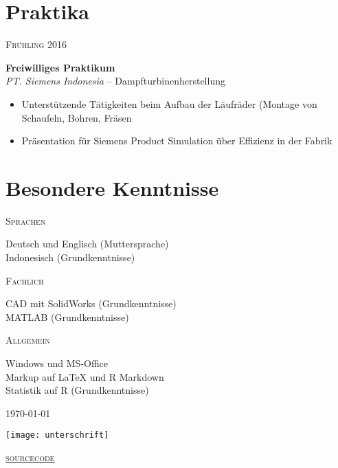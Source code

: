 \documentclass[a4paper]{article}
\newcommand{\entry}[4]{

	\begin{minipage}[t]{.20\textwidth}
		\hfill \textsc{#1}

	\end{minipage}
	\hfill\vline\hfill
	\begin{minipage}[t]{.75\textwidth}
		\textbf{#2} \\ 
		\textit{#3}    
		#4

	\end{minipage} 
	\vspace{.25cm}

}
\newcommand{\nentry}[2]{

	\begin{minipage}[t]{.20\textwidth}
		\hfill \textsc{#1}

	\end{minipage}
	\hfill\vline\hfill
	\begin{minipage}[t]{.75\textwidth}
		#2 

	\end{minipage}
	\vspace{.25cm} 

}
\begin{document}
\section{Praktika}

\entry{Fr{\"u}hling 2016}{Freiwilliges Praktikum}{PT. Siemens Indonesia}{-- Dampfturbinenherstellung\vspace{-.25cm} 
	\begin{itemize}[leftmargin=*]
		\setlength{\itemsep}{-3pt}
		\item Unterst{\"u}tzende T{\"a}tigkeiten beim Aufbau der L{\"a}ufr{\"a}der \newline \phantom{W}(Montage von Schaufeln, Bohren, Fr{\"a}sen
		\item Pr{\"a}sentation f{\"u}r Siemens Product Simulation {\"u}ber Effizienz in der Fabrik
	\end{itemize}	
}

\section{Besondere Kenntnisse}

\nentry{Sprachen}{Deutsch und Englisch (Muttersprache)\\ Indonesisch (Grundkenntnisse)}

\nentry{Fachlich}{CAD mit SolidWorks (Grundkenntnisse) \\ MATLAB (Grundkenntnisse)}

\nentry{Allgemein}{Windows und MS-Office\\Markup auf {\LaTeX} und R Markdown\\Statistik auf R (Grundkenntnisse)}

\vspace*{\fill} 
\begin{minipage}{0.4\textwidth}
	\today
\end{minipage}
\begin{minipage}{0.19\textwidth}
	\centering
	\hspace{-50mm}\texttt{[image: unterschrift]}
\end{minipage}
\begin{minipage}{0.4\textwidth}
	\flushright
	\href{https://github.com/emfiedler/cv/blob/master/CV.tex}{\textsc{sourcecode}}
\end{minipage}
\end{document}
